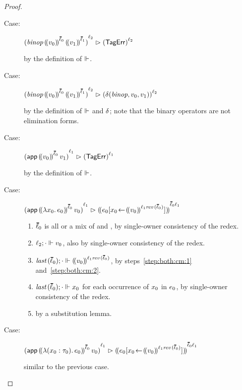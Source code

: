 \documentclass[ twoside,open=right,titlepage,numbers=noenddot,headinclude,%
                footinclude=true,cleardoublepage=empty,abstract=off,
                BCOR=5mm,paper=a4,fontsize=11pt,%
                ngerman,american,%
                parts,pdfspacing]{scrreprt}
\begin{document}
{\begin{proof}
\begin{description}
  \item[Case:]
    \(\obars{\ebinop{\obbars{\svalue_0}{\sownerlist_0}}{\obbars{\svalue_1}{\sownerlist_1}}}{\sowner_2} \snr \obars{\stagerror}{\sowner_2}\)
  \item[]
    by the definition of $\Vdash$.

  \item[Case:]
    \(\obars{\ebinop{\obbars{\svalue_0}{\sownerlist_0}}{\obbars{\svalue_1}{\sownerlist_1}}}{\sowner_2} \snr \obars{\sdelta(\sbinop, \svalue_0, \svalue_1)}{\sowner_2}\)
  \item[]
    by the definition of $\Vdash$ and $\delta$; note that the binary operators are not elimination forms.

  \item[Case:]
    \(\obars{\eappu{\obbars{\svalue_0}{\sownerlist_0}}{\svalue_1}}{\sowner_1} \snr \obars{\stagerror}{\sowner_1}\)
  \item[]
    by the definition of $\Vdash$.

  \item[Case:]
    \(\obars{\eappu{\obbars{\efun{\svar_0}{\sexpr_0}}{\sownerlist_0}}{\svalue_0}}{\sowner_1} \snr \obbars{\esubst{\sexpr_0}{\svar_0}{\obbars{\svalue_0}{\fconcat{\sowner_1}{\frev{\sownerlist_0}}}}}{\fconcat{\sownerlist_0}{\sowner_1}}\)
  \subitem
    \begin{enumerate}
    \item\label{step:both:cm:1}
      $\sownerlist_0$ is all \sdeep{} or a mix of \sshallow{} and \suntyped{}, by single-owner consistency of the redex.
    \item\label{step:both:cm:2}
      $\ell_2; \cdot \Vdash v_0$, also by single-owner consistency of the redex.
    \item
      $\flast{\sownerlist_0}; \cdot \sWL \obbars{\svalue_0}{\fconcat{\sowner_1}{\frev{\sownerlist_0}}}$, by steps~\ref{step:both:cm:1} and~\ref{step:both:cm:2}.
    \item
      $\flast{\sownerlist_0}; \cdot \sWL \svar_0$ for each occurrence of $x_0$ in $e_0$, by single-owner consistency of the redex.
    \item
      by a substitution lemma.
    \end{enumerate}

  \item[Case:]
    \(\obars{\eappu{\obbars{\efun{\tann{\svar_0}{\stype_0}}{\sexpr_0}}{\sownerlist_0}}{\svalue_0}}{\sowner_1} \snr \obbars{\esubst{\sexpr_0}{\svar_0}{\obbars{\svalue_0}{\fconcat{\sowner_1}{\frev{\sownerlist_0}}}}}{\fconcat{\sownerlist_0}{\sowner_1}}\)
  \item[]
    similar to the previous case.


\end{description}
\end{proof}}
\end{document}
